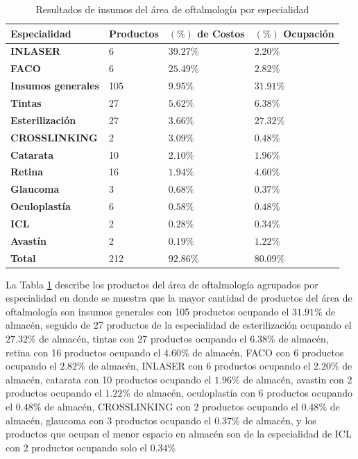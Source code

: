 \begin{table}[H]
    \caption{Resultados de insumos del área de oftalmología por especialidad}
    \begin{tabular}{p{4cm} p{2.5cm} p{3cm} p{3cm}} %
        \hline
        \textbf{Especialidad} & \textbf{Productos} & \textbf{$(\%)$ de Costos} & \textbf{$(\%)$ Ocupación} \\
        \hline
        \textbf{INLASER} & 6 & $39.27\%$ & $2.20\%$ \\
        \textbf{FACO} & 6 & $25.49\%$ & $2.82\%$ \\
        \textbf{Insumos generales} & 105 & $9.95\%$ & $31.91\%$ \\
        \textbf{Tintas} & 27 & $5.62\%$ & $6.38\%$ \\
        \textbf{Esterilización} & 27 & $3.66\%$ & $27.32\%$ \\
        \textbf{CROSSLINKING} & 2 & $3.09\%$ & $0.48\%$ \\
        \textbf{Catarata} & 10 & $2.10\%$ & $1.96\%$ \\
        \textbf{Retina} & 16 & $1.94\%$ & $4.60\%$ \\
        \textbf{Glaucoma} & 3 & $0.68\%$ & $0.37\%$ \\
        \textbf{Oculoplastía} & 6 & $0.58\%$ & $0.48\%$ \\
        \textbf{ICL} & 2 & $0.28\%$ & $0.34\%$ \\
        \textbf{Avastín} & 2 & $0.19\%$ & $1.22\%$ \\
        \hline
        \textbf{Total} & 212 & $92.86\%$ & $80.09\%$
    \end{tabular}
    \label{table:productos_oftalmologia}
\end{table}

La Tabla \ref{table:productos_oftalmologia} describe los productos del área de oftalmología agrupados por especialidad en donde se muestra que la mayor cantidad de productos del área de oftalmología son insumos generales con 105 productos ocupando el $31.91\%$ de almacén, seguido de 27 productos de la especialidad de esterilización ocupando el $27.32\%$ de almacén, tintas con 27 productos ocupando el $6.38\%$ de almacén, retina con 16 productos ocupando el $4.60\%$ de almacén, FACO con 6 productos ocupando el $2.82\%$ de almacén, INLASER con 6 productos ocupando el $2.20\%$ de almacén, catarata con 10 productos ocupando el $1.96\%$ de almacén, avastin con 2 productos ocupando el $1.22\%$ de almacén, oculoplastía con 6 productos ocupando el $0.48\%$ de almacén, CROSSLINKING con 2 productos ocupando el $0.48\%$ de almacén, glaucoma con 3 productos ocupando el $0.37\%$ de almacén, y los productos que ocupan el menor espacio en almacén son de la especialidad de ICL con 2 productos ocupando solo el $0.34\%$

